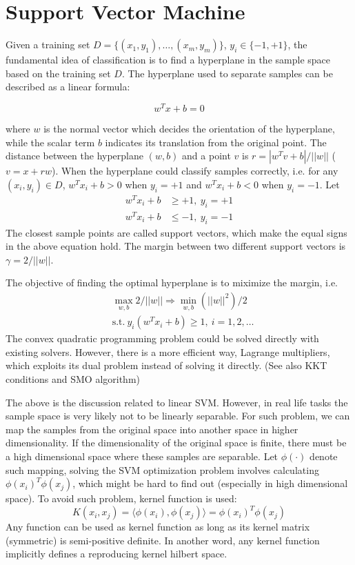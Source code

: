 \section{Support Vector Machine}

Given a training set $D=\{(x_1,y_1),\ldots,(x_m,y_m)\}$, $y_i\in\{-1,+1\}$,
the fundamental idea of classification is to find a hyperplane in the sample
space based on the training set $D$. The hyperplane used to separate samples
can be described as a linear formula:

$$ w^T x + b = 0 $$

where $w$ is the normal vector which decides the orientation of the hyperplane,
while the scalar term $b$ indicates its translation from the original point.
The distance between the hyperplane $(w,b)$ and a point $v$ is $r =
|w^Tv+b|/||w||$ ($v = x + rw$). When the hyperplane could classify samples
correctly, i.e. for any $(x_i,y_i)\in D$, $w^Tx_i+b>0$ when $y_i=+1$ and
$w^Tx_i+b<0$ when $y_i=-1$. Let
\begin{align}
w^Tx_i + b &\geqslant +1, ~ y_i = +1 \\
w^Tx_i + b &\leqslant -1, ~ y_i = -1
\end{align}
The closest sample points are called support vectors, which make the equal
signs in the above equation hold. The margin between two different support
vectors is $\gamma = 2/||w||$.

The objective of finding the optimal hyperplane is to miximize the margin, i.e.
\begin{align}
&\max_{w,b} 2/||w|| \Rightarrow \min_{w,b} (||w||^2)/2 \\
&\text{s.t.}~ y_i (w^Tx_i + b) \geqslant 1, ~i=1,2,\ldots
\end{align}
The convex quadratic programming problem could be solved directly with existing
solvers. However, there is a more efficient way, Lagrange multipliers, which
exploits its dual problem instead of solving it directly. (See also KKT
conditions and SMO algorithm)

The above is the discussion related to linear SVM. However, in real life tasks
the sample space is very likely not to be linearly separable. For such problem,
we can map the samples from the original space into another space in higher
dimensionality. If the dimensionality of the original space is finite, there
must be a high dimensional space where these samples are separable. Let $\phi(\cdot)$
denote such mapping, solving the SVM optimization problem involves calculating
$\phi(x_i)^T\phi(x_j)$, which might be hard to find out (especially in high
dimensional space). To avoid such problem, kernel function is used:
$$ K(x_i,x_j) = \langle \phi(x_i), \phi(x_j) \rangle = \phi(x_i)^T\phi(x_j)$$
Any function can be used as kernel function as long as its kernel matrix (symmetric)
is semi-positive definite. In another word, any kernel function implicitly defines
a reproducing kernel hilbert space.

